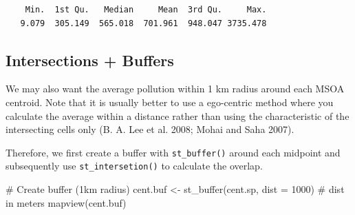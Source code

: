 \documentclass[
  letterpaper,
]{scrbook}
\newenvironment{Shaded}{\begin{snugshade}}{\end{snugshade}}
\newcommand{\AttributeTok}[1]{\textcolor[rgb]{0.40,0.45,0.13}{#1}}
\newcommand{\CommentTok}[1]{\textcolor[rgb]{0.37,0.37,0.37}{#1}}
\newcommand{\DecValTok}[1]{\textcolor[rgb]{0.68,0.00,0.00}{#1}}
\newcommand{\FunctionTok}[1]{\textcolor[rgb]{0.28,0.35,0.67}{#1}}
\newcommand{\NormalTok}[1]{\textcolor[rgb]{0.00,0.23,0.31}{#1}}
\newcommand{\OtherTok}[1]{\textcolor[rgb]{0.00,0.23,0.31}{#1}}
\begin{document}
\begin{verbatim}
    Min.  1st Qu.   Median     Mean  3rd Qu.     Max. 
   9.079  305.149  565.018  701.961  948.047 3735.478 
\end{verbatim}

\hypertarget{intersections-buffers}{%
\subsection{Intersections + Buffers}\label{intersections-buffers}}

We may also want the average pollution within 1 km radius around each
MSOA centroid. Note that it is usually better to use a ego-centric
method where you calculate the average within a distance rather than
using the characteristic of the intersecting cells only (B. A. Lee et
al. 2008; Mohai and Saha 2007).

Therefore, we first create a buffer with \texttt{st\_buffer()} around
each midpoint and subsequently use \texttt{st\_intersetion()} to
calculate the overlap.

\begin{Shaded}
\begin{Highlighting}[]
\CommentTok{\# Create buffer (1km radius)}
\NormalTok{cent.buf }\OtherTok{\textless{}{-}} \FunctionTok{st\_buffer}\NormalTok{(cent.sp, }
                      \AttributeTok{dist =} \DecValTok{1000}\NormalTok{) }\CommentTok{\# dist in meters}
\FunctionTok{mapview}\NormalTok{(cent.buf)}
\end{Highlighting}
\end{Shaded}
\end{document}
